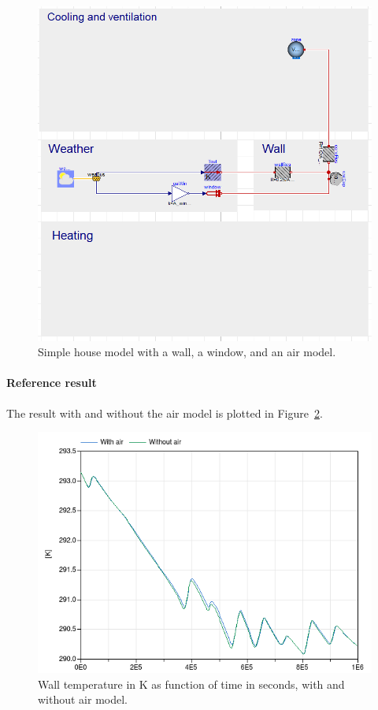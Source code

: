 \documentclass[10pt,a4paper]{article}
\begin{document}
 \begin{figure}[h!]
\centering
\includegraphics[scale=0.4]{airModel.png}
\caption{Simple house model with a wall, a window, and an air model.}
\label{fig:airModel}
\end{figure} 

\paragraph{Reference result}
The result with and without the air model
is plotted in Figure~\ref{fig:res3}.

 

\begin{figure}
\centering
\includegraphics[scale=0.6]{result3.png}
\caption{Wall temperature in K as function of time in seconds,
with and without air model.}
\label{fig:res3}
\end{figure}
\end{document}
